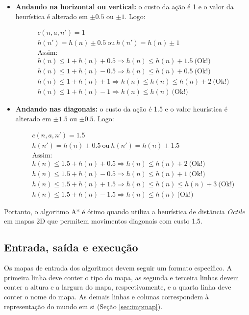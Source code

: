 \documentclass[12pt]{article}
\begin{document}
\begin{itemize}
	\item \textbf{Andando na horizontal ou vertical:} o custo da ação é 1 e o valor da heurística é alterado em $ \pm 0.5 $ ou $ \pm 1 $. Logo:

	\begin{align*}
		c(n, a, n') = 1 \\
		h(n') = h(n) \pm 0.5 ~ \text{ou} ~ h(n') = h(n) \pm 1 \\
		\text{Assim:} \\
		h(n) \leq 1 + h(n) + 0.5 \Rightarrow h(n) \leq h(n) + 1.5 ~ \text{(Ok!)} \\
		h(n) \leq 1 + h(n) - 0.5 \Rightarrow h(n) \leq h(n) + 0.5 ~ \text{(Ok!)} \\
		h(n) \leq 1 + h(n) + 1 \Rightarrow h(n) \leq h(n) \leq h(n) + 2 ~ \text{(Ok!)} \\
		h(n) \leq 1 + h(n) - 1 \Rightarrow h(n) \leq h(n) ~ \text{(Ok!)}
	\end{align*}

	\item \textbf{Andando nas diagonais:} o custo da ação é 1.5 e o valor heurística é alterado em $ \pm 1.5 $ ou $ \pm 0.5 $. Logo:

	\begin{align*}
		c(n, a, n') = 1.5 \\
		h(n') = h(n) \pm 0.5 ~ \text{ou} ~ h(n') = h(n) \pm 1.5 \\
		\text{Assim:} \\
		h(n) \leq 1.5 + h(n) + 0.5 \Rightarrow h(n) \leq h(n) + 2 ~ \text{(Ok!)} \\
		h(n) \leq 1.5 + h(n) - 0.5 \Rightarrow h(n) \leq h(n) + 1 ~ \text{(Ok!)} \\
		h(n) \leq 1.5 + h(n) + 1.5 \Rightarrow h(n) \leq h(n) \leq h(n) + 3 ~ \text{(Ok!)} \\
		h(n) \leq 1.5 + h(n) - 1.5 \Rightarrow h(n) \leq h(n) ~ \text{(Ok!)}
	\end{align*}
\end{itemize}

Portanto, o algoritmo A* é ótimo quando utiliza a heurística de distância \textit{Octile} em mapas 2D que permitem movimentos diagonais com custo 1.5.

\subsection{Entrada, saída e execução}

Os mapas de entrada dos algoritmos devem seguir um formato específico. A primeira linha deve conter o tipo do mapa, as segunda e terceira linhas devem conter a altura e a largura do mapa, respectivamente, e a quarta linha deve conter o nome do mapa. As demais linhas e colunas correspondem à representação do mundo em si (Seção \ref{sec:impmap}).
\end{document}
